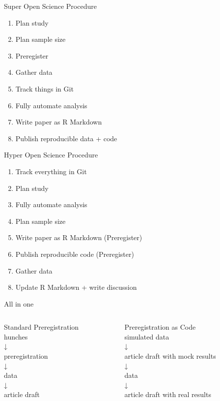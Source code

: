 \documentclass[12pt,t]{beamer}
\begin{document}
\begin{frame}[c]{Super Open Science Procedure}
  \begin{enumerate}
    \item Plan study
    \item \textcolor{vhilit}{Plan sample size}
    \item Preregister
    \item Gather data
    \item \textcolor{hilit}{Track things in Git}
    \item \textcolor{hilit}{Fully automate analysis}
    \item  Write paper as \textcolor{hilit}{R Markdown}
    \item Publish \textcolor{hilit}{reproducible} data + code
  \end{enumerate}
\end{frame}

\begin{frame}[c]{Hyper Open Science Procedure}
  \begin{enumerate}
    \item Track everything in Git
    \item Plan study
    \item Fully automate analysis
    \item Plan sample size
    \item Write paper as R Markdown (Preregister)
    \item Publish reproducible code (Preregister)
    \item \textcolor{hilit}{Gather data}
    \item Update R Markdown + write discussion
  \end{enumerate}
\end{frame}

\begin{frame}[c]{All in one}
\begin{columns}
\begin{column}{0.5\textwidth}
  \centering
  \textcolor{vhilit}{Standard Preregistration}\vspace{5mm} \\
hunches\\
↓\\
preregistration\\
↓\\
data\\
↓\\
article draft
\end{column}
\begin{column}{0.5\textwidth}
  \centering
\textcolor{hilit}{Preregistration as Code}\vspace{5mm} \\ 
simulated data\\
↓\\
article draft with mock results\\
↓\\
data\\
↓\\
article draft with real results
\end{column}
\end{columns}
\end{frame}
\end{document}
